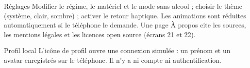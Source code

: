\begin{exigence}[priorite=moyenne]{Réglages}
  Modifier le régime, le matériel et le mode sans alcool ; choisir le thème
  (système, clair, sombre) ; activer le retour haptique. Les animations sont
  réduites automatiquement si le téléphone le demande. Une page À propos
  cite les sources, les mentions légales et les licences open source
  (écrans 21 et 22).
\end{exigence}

\begin{exigence}[priorite=basse]{Profil local}
  L'icône de profil ouvre une connexion simulée : un prénom et un avatar
  enregistrés sur le téléphone. Il n'y a ni compte ni authentification.
\end{exigence}
